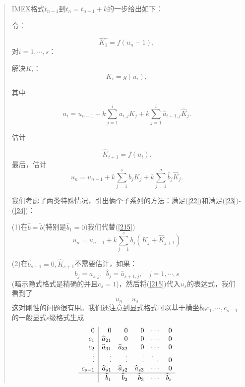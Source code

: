 \documentclass{article}
\begin{document}
\begin{CJK}{UTF8}{gkai}
\begin{quotation}
IMEX格式$t_{n-1}$到$t_{n}=t_{n-1}+k$的一步给出如下：

令：

\begin{equation}
\widehat{K_{1}}=f(u_{n}-1),
\label{211}
\end{equation}
对$i=1,\cdots,s$：

\textbullet 解决$K_{i}$：
\begin{equation}
K_{i}=g(u_{i}),
\label{212}
\end{equation}

其中

\begin{equation}
u_{i}=u_{n-1}+k\sum_{j=1}^{i}a_{i,j}K_{j}+k\sum_{j=1}^{i}\widehat{a}_{i+1,j}\widehat{K}_{j}.
\label{213}
\end{equation}

\textbullet 估计

\begin{equation}
\widehat{K}_{i+1}=f(u_{i}).
\label{214}
\end{equation}
最后，估计
\begin{equation}
u_{n}=u_{n-1}+k\sum_{j=1}^{s}b_{j}K_{j}+k\sum_{j=1}^{\sigma}\widehat{b}_{j}\widehat{K}_{j}.
\label{215}
\end{equation}

我们考虑了两类特殊情况，引出俩个子系列的方法：满足(\ref{22})和满足(\ref{23})-(\ref{24})：

(1)在$\widehat{b}=\tilde{b}$(特别是$\widehat{b}_{1}=0$)我们代替(\ref{215})
\begin{equation}
u_{n}=u_{n-1}+k\sum_{j=1}^{s}b_{j}(K_{j}+\widehat{K}_{j+1})
\label{22}
\end{equation}

(2)在$\widehat{b}_{s+1}=0,\widehat{K}_{s+1}$不需要估计，如果：
\begin{equation}
b_{j}=a_{s,j},~~\widehat{b}_{j}=\widehat{a}_{s+1,j},~~~~j=1,\cdots,s
\label{23}
\end{equation}
(暗示隐式格式是精确的并且$c_{s}=1$)，然后将(\ref{215})代入$u_{s}$的表达式，我们看到了
\begin{equation}
u_{n}=u_{s}
\label{24}
\end{equation}
这对刚性的问题很有用。我们还注意到显式格式可以基于横坐标$c_{1},\cdots,c_{s-1}$的一般显式s级格式生成
\[
\begin{array}{r|r r r r r}
0 & 0 & 0 & 0 & \cdots & 0\\
c_{1}  & \widehat{a}_{21} & 0 & 0 & \cdots & 0\\
c_{2}  & \widehat{a}_{31} & \widehat{a}_{32} & 0 & \cdots & 0\\\
\vdots & \vdots & \vdots & \vdots & \ddots & 0\\
c_{s-1}  & \widehat{a}_{s1} & \widehat{a}_{s2} & \widehat{a}_{s3} & \cdots & 0\\
\hline
& \widehat{b}_{1} & \widehat{b}_{2} & \widehat{b}_{3} & \cdots & \widehat{b}_{s}
\end{array}
\]


\end{quotation}
\end{CJK}
\end{document}
